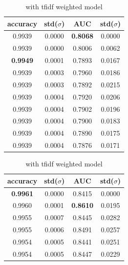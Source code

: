 \begin{table}
  \begin{subtable}{.5\linewidth}
    \centering
    \begin{tabular}{cccc} \toprule
      accuracy        & std($\sigma$) & AUC             & std($\sigma$) \\ \midrule
      0.9939          & 0.0000        & \textbf{0.8068} & 0.0000 \\
      0.9939          & 0.0000        & 0.8006          & 0.0062 \\
      \textbf{0.9949} & 0.0001        & 0.7893          & 0.0167 \\
      0.9939          & 0.0003        & 0.7960          & 0.0186 \\
      0.9939          & 0.0003        & 0.7892          & 0.0215 \\ \midrule
      0.9939          & 0.0004        & 0.7920          & 0.0206 \\
      0.9939          & 0.0004        & 0.7902          & 0.0196 \\
      0.9939          & 0.0004        & 0.7900          & 0.0183 \\
      0.9939          & 0.0004        & 0.7890          & 0.0175 \\
      0.9939          & 0.0004        & 0.7876          & 0.0171 \\ \bottomrule
    \end{tabular}
      \caption{with tfidf weighted model}
      \label{tab:tfidf-model}
  \end{subtable}
  \begin{subtable}{.5\linewidth}
    \centering
    \begin{tabular}{cccc} \toprule
      accuracy        & std($\sigma$) & AUC             & std($\sigma$) \\ \midrule
      \textbf{0.9961} & 0.0000        & 0.8415          & 0.0000 \\
      0.9960          & 0.0001        & \textbf{0.8610} & 0.0195 \\
      0.9955          & 0.0007        & 0.8445          & 0.0282 \\
      0.9955          & 0.0006        & 0.8491          & 0.0257 \\
      0.9954          & 0.0005        & 0.8441          & 0.0251 \\ \midrule
      0.9954          & 0.0005        & 0.8447          & 0.0229 \\

\end{tabular}
\end{subtable}
\end{table}
